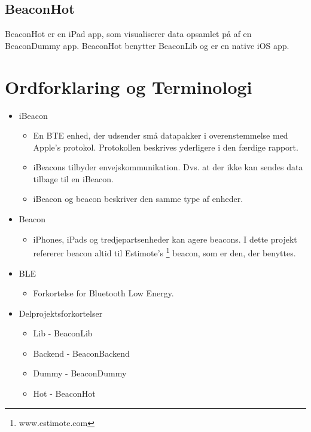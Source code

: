 \subsection{BeaconHot}
BeaconHot er en iPad app, som visualiserer data opsamlet på af en BeaconDummy app. BeaconHot benytter BeaconLib og er en native iOS app.

\section{Ordforklaring og Terminologi}

\begin{itemize}
	\item iBeacon
		\begin{itemize}
			\item En BTE enhed, der udsender små datapakker i overenstemmelse med Apple's protokol. Protokollen beskrives yderligere i den færdige rapport.
			\item iBeacons tilbyder envejskommunikation. Dvs. at der ikke kan sendes data tilbage til en iBeacon.
			\item iBeacon og beacon beskriver den samme type af enheder.
		\end{itemize}
		
	\item Beacon
		\begin{itemize}
			\item iPhones, iPads og tredjepartsenheder kan agere beacons. I dette projekt refererer beacon altid til Estimote's \footnote{www.estimote.com} beacon, som er den, der benyttes.
		\end{itemize}
		
	\item BLE
		\begin{itemize}
			\item Forkortelse for Bluetooth Low Energy.
		\end{itemize}
		
	\item Delprojektsforkortelser
		\begin{itemize}
			\item Lib - BeaconLib
			\item Backend - BeaconBackend
			\item Dummy - BeaconDummy
			\item Hot - BeaconHot
		\end{itemize}
\end{itemize}